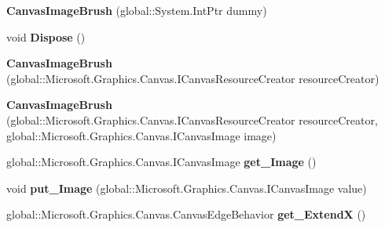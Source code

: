 \begin{DoxyCompactItemize}
{\bfseries Canvas\+Image\+Brush} (global\+::\+System.\+Int\+Ptr dummy)
\item 
\mbox{\label{class_microsoft_1_1_graphics_1_1_canvas_1_1_brushes_1_1_canvas_image_brush_a287a8959ebff5767a97c27bfd52ec3b7}} 
void {\bfseries Dispose} ()
\item 
\mbox{\label{class_microsoft_1_1_graphics_1_1_canvas_1_1_brushes_1_1_canvas_image_brush_adbb56b8d19fbd4dfd899d515aba49f92}} 
{\bfseries Canvas\+Image\+Brush} (global\+::\+Microsoft.\+Graphics.\+Canvas.\+I\+Canvas\+Resource\+Creator resource\+Creator)
\item 
\mbox{\label{class_microsoft_1_1_graphics_1_1_canvas_1_1_brushes_1_1_canvas_image_brush_aeb29fd1437d8ae16d2fe8546010eb7db}} 
{\bfseries Canvas\+Image\+Brush} (global\+::\+Microsoft.\+Graphics.\+Canvas.\+I\+Canvas\+Resource\+Creator resource\+Creator, global\+::\+Microsoft.\+Graphics.\+Canvas.\+I\+Canvas\+Image image)
\item 
\mbox{\label{class_microsoft_1_1_graphics_1_1_canvas_1_1_brushes_1_1_canvas_image_brush_acd493d96591a7820f9e9bada709041ad}} 
global\+::\+Microsoft.\+Graphics.\+Canvas.\+I\+Canvas\+Image {\bfseries get\+\_\+\+Image} ()
\item 
\mbox{\label{class_microsoft_1_1_graphics_1_1_canvas_1_1_brushes_1_1_canvas_image_brush_af68d570f7be103d2a799285c816315c9}} 
void {\bfseries put\+\_\+\+Image} (global\+::\+Microsoft.\+Graphics.\+Canvas.\+I\+Canvas\+Image value)
\item 
\mbox{\label{class_microsoft_1_1_graphics_1_1_canvas_1_1_brushes_1_1_canvas_image_brush_ab8eedf6b67df8a2df6174d213c8ff556}} 
global\+::\+Microsoft.\+Graphics.\+Canvas.\+Canvas\+Edge\+Behavior {\bfseries get\+\_\+\+ExtendX} ()
\item 
\mbox{\label{class_microsoft_1_1_graphics_1_1_canvas_1_1_brushes_1_1_canvas_image_brush_aca638fc134d4d7aeb045f7af68be64d4}} 

\end{DoxyCompactItemize}
